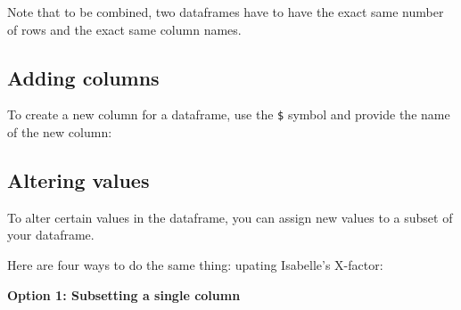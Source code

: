 \documentclass[
]{book}
\newenvironment{Shaded}{\begin{snugshade}}{\end{snugshade}}
\newcommand{\DecValTok}[1]{\textcolor[rgb]{0.00,0.00,0.81}{#1}}
\newcommand{\KeywordTok}[1]{\textcolor[rgb]{0.13,0.29,0.53}{\textbf{#1}}}
\newcommand{\NormalTok}[1]{#1}
\newcommand{\OperatorTok}[1]{\textcolor[rgb]{0.81,0.36,0.00}{\textbf{#1}}}
\newcommand{\StringTok}[1]{\textcolor[rgb]{0.31,0.60,0.02}{#1}}
\begin{document}
Note that to be combined, two dataframes have to have the exact same number of rows and the exact same column names.

\hypertarget{adding-columns}{%
\subsection*{Adding columns}\label{adding-columns}}

To create a new column for a dataframe, use the \texttt{\$} symbol and provide the name of the new column:

\begin{Shaded}
\end{Shaded}

\hypertarget{altering-values}{%
\subsection*{Altering values}\label{altering-values}}

To alter certain values in the dataframe, you can assign new values to a subset of your dataframe.

Here are four ways to do the same thing: upating Isabelle's X-factor:

\textbf{Option 1: Subsetting a single column}

\begin{Shaded}
\end{Shaded}
\end{document}
